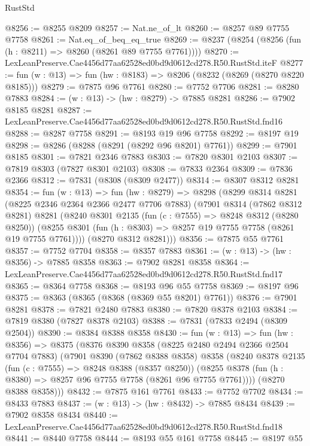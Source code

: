 \begin{lexlean}{RustStd}
\begin{coremodule}
@8256 := @8255 @8209
@8257 := Nat.ne_of_lt
@8260 := @8257 @89 @7755 @7758
@8261 := Nat.eq_of_beq_eq_true
@8269 := @8237 (@8254 (@8256 (fun (h : @8211) => @8260 (@8261 @89 @7755 @7761))))
@8270 := LexLeanPreserve.Cae4456d77aa62528ed0bd9d0612cd278.R50.RustStd.iteF
@8277 := fun (w : @13) => fun (hw : @8183) => @8206 (@8232 (@8269 (@8270 @8220 @8185)))
@8279 := @7875 @96 @7761
@8280 := @7752 @7706
@8281 := @8280 @7883
@8284 := (w : @13) -> (hw : @8279) -> @7885 @8281
@8286 := @7902 @8185 @8281
@8287 := LexLeanPreserve.Cae4456d77aa62528ed0bd9d0612cd278.R50.RustStd.fnd16
@8288 := @8287 @7758
@8291 := @8193 @19 @96 @7758
@8292 := @8197 @19
@8298 := @8286 (@8288 (@8291 (@8292 @96 @8201) @7761))
@8299 := @7901 @8185
@8301 := @7821 @2346 @7883
@8303 := @7820 @8301 @2103
@8307 := @7819 @8303 (@7827 @8301 @2103)
@8308 := @7833 @2364
@8309 := @7836 @2366
@8312 := @7831 (@8308 (@8309 @2477))
@8314 := @8307 @8312 @8281
@8354 := fun (w : @13) =>
  fun (hw : @8279) =>
  @8298
    (@8299
      @8314
      @8281
      (@8225 @2346 @2364 @2366 @2477 @7706 @7883)
      (@7901
        @8314
        (@7862 @8312 @8281)
        @8281
        (@8240
          @8301
          @2135
          (fun (c : @7555) => @8248 @8312 (@8280 @8250))
          (@8255 @8301 (fun (h : @8303) => @8257 @19 @7755 @7758 (@8261 @19 @7755 @7761))))
        (@8270 @8312 @8281)))
@8356 := @7875 @55 @7761
@8357 := @7752 @7704
@8358 := @8357 @7883
@8361 := (w : @13) -> (hw : @8356) -> @7885 @8358
@8363 := @7902 @8281 @8358
@8364 := LexLeanPreserve.Cae4456d77aa62528ed0bd9d0612cd278.R50.RustStd.fnd17
@8365 := @8364 @7758
@8368 := @8193 @96 @55 @7758
@8369 := @8197 @96
@8375 := @8363 (@8365 (@8368 (@8369 @55 @8201) @7761))
@8376 := @7901 @8281
@8378 := @7821 @2480 @7883
@8380 := @7820 @8378 @2103
@8384 := @7819 @8380 (@7827 @8378 @2103)
@8388 := @7831 (@7833 @2494 (@8309 @2504))
@8390 := @8384 @8388 @8358
@8430 := fun (w : @13) =>
  fun (hw : @8356) =>
  @8375
    (@8376
      @8390
      @8358
      (@8225 @2480 @2494 @2366 @2504 @7704 @7883)
      (@7901
        @8390
        (@7862 @8388 @8358)
        @8358
        (@8240
          @8378
          @2135
          (fun (c : @7555) => @8248 @8388 (@8357 @8250))
          (@8255 @8378 (fun (h : @8380) => @8257 @96 @7755 @7758 (@8261 @96 @7755 @7761))))
        (@8270 @8388 @8358)))
@8432 := @7875 @161 @7761
@8433 := @7752 @7702
@8434 := @8433 @7883
@8437 := (w : @13) -> (hw : @8432) -> @7885 @8434
@8439 := @7902 @8358 @8434
@8440 := LexLeanPreserve.Cae4456d77aa62528ed0bd9d0612cd278.R50.RustStd.fnd18
@8441 := @8440 @7758
@8444 := @8193 @55 @161 @7758
@8445 := @8197 @55

\end{coremodule}
\end{lexlean}
